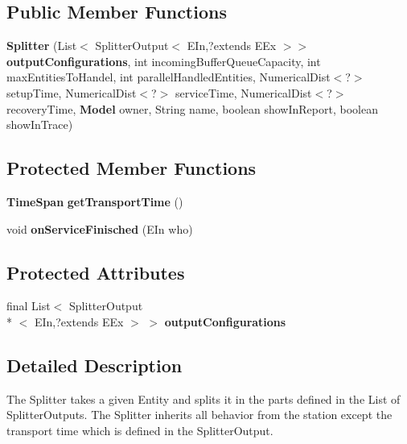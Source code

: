 \subsection*{Public Member Functions}
\begin{DoxyCompactItemize}
\item 
{\bf Splitter} (List$<$ Splitter\-Output$<$ E\-In,?extends E\-Ex $>$$>$ {\bf output\-Configurations}, int incoming\-Buffer\-Queue\-Capacity, int max\-Entities\-To\-Handel, int parallel\-Handled\-Entities, Numerical\-Dist$<$?$>$ setup\-Time, Numerical\-Dist$<$?$>$ service\-Time, Numerical\-Dist$<$?$>$ recovery\-Time, {\bf Model} owner, String name, boolean show\-In\-Report, boolean show\-In\-Trace)
\end{DoxyCompactItemize}
\subsection*{Protected Member Functions}
\begin{DoxyCompactItemize}
\item 
{\bf Time\-Span} {\bfseries get\-Transport\-Time} ()\label{classdesmoj_1_1extensions_1_1chaining_1_1_splitter_3_01_e_in_01extends_01_entity_00_01_e_ex_01extends_01_entity_01_4_a277f5ed63ab6f14d7057093617c4d79c}

\item 
void {\bf on\-Service\-Finisched} (E\-In who)
\end{DoxyCompactItemize}
\subsection*{Protected Attributes}
\begin{DoxyCompactItemize}
\item 
final List$<$ Splitter\-Output\\*
$<$ E\-In,?extends E\-Ex $>$ $>$ {\bf output\-Configurations}
\end{DoxyCompactItemize}


\subsection{Detailed Description}
The Splitter takes a given Entity and splits it in the parts defined in the List of Splitter\-Outputs. The Splitter inherits all behavior from the station except the transport time which is defined in the Splitter\-Output.


